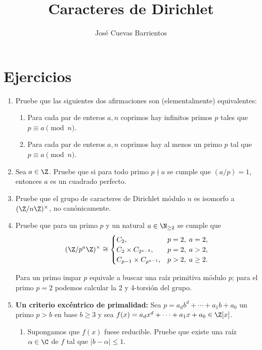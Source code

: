 \documentclass[11pt, reqno]{amsart}
\title{Caracteres de Dirichlet}
\date{\DTMdate{2025-08-28}}
\author[José Cuevas]{José Cuevas Barrientos}
\begin{document}
\maketitle

\section{Ejercicios}
\begin{enumerate}
	\item Pruebe que las siguientes dos afirmaciones son (elementalmente) equivalentes:
		\begin{enumerate}
			\item Para cada par de enteros $a, n$ coprimos hay infinitos  primos $p$ tales que $p \equiv a \pmod n$.
			\item Para cada par de enteros $a, n$ coprimos hay al menos un primo $p$ tal   que $p \equiv a \pmod n$.
		\end{enumerate}

		\newex
	\item\lookright
		Sea $a \in \Z$.
		Pruebe que si para todo primo $p \nmid a$ se cumple que $(a/p) = 1$, entonces $a$ es un cuadrado perfecto.

		\newex
	\item Pruebe que el grupo de caracteres de Dirichlet módulo $n$ es isomorfo a $(\Z/n\Z)^\times$, no canónicamente.

		\newex
	\item Pruebe que para un primo $p$ y un natural $a \in \N_{\ge 2}$ se cumple que
		\[
			(\Z/p^a\Z)^\times \cong
			\begin{cases}
				C_2, & p = 2, \; a = 2, \\
				C_2 \times C_{2^{a-2}}, & p = 2, \; a > 2, \\
				C_{p-1} \times C_{p^{a-1}}, & p > 2, \; a \ge 2.
			\end{cases}
		\]
		\begin{hint}
			Para un primo impar $p$ equivale a buscar una raíz primitiva módulo $p$;
			para el primo $p = 2$ podemos calcular la 2 y 4-torsión del grupo.
		\end{hint}

		\newex
	\item\lookst
		\textbf{Un criterio excéntrico de primalidad:}
		Sea $p = a_db^d + \cdots + a_1b + a_0$ un primo $p > b$ en base $b \ge 3$ y
		sea $f(x) = a_dx^d + \cdots + a_1x + a_0 \in \Z[x]$.
		\begin{enumerate}
			\item Supongamos que $f(x)$ fuese reducible.
				Pruebe que existe una raíz $\alpha \in \C$ de $f$ tal que $|b - \alpha| \le 1$.


\end{enumerate}
\end{enumerate}
\end{document}
